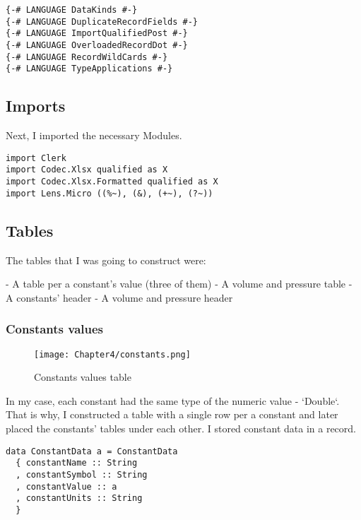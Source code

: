 \begin{listing}[!h]
  \begin{verbatim}
{-# LANGUAGE DataKinds #-}
{-# LANGUAGE DuplicateRecordFields #-}
{-# LANGUAGE ImportQualifiedPost #-}
{-# LANGUAGE OverloadedRecordDot #-}
{-# LANGUAGE RecordWildCards #-}
{-# LANGUAGE TypeApplications #-}
\end{verbatim}
\caption{Language extensions}
\label{example3:extensions}
\end{listing}

\subsection{Imports}

Next, I imported the necessary Modules.

\begin{listing}[!h]
  \begin{verbatim}
import Clerk
import Codec.Xlsx qualified as X
import Codec.Xlsx.Formatted qualified as X
import Lens.Micro ((%~), (&), (+~), (?~))
\end{verbatim}
\caption{Imports}
\label{example3:imports}
\end{listing}

\subsection{Tables}

The tables that I was going to construct were:

- A table per a constant's value (three of them)
- A volume and pressure table
- A constants' header
- A volume and pressure header

\subsubsection{Constants values}

\begin{figure}[h]
  \centering
  \texttt{[image: Chapter4/constants.png]}
  \caption{Constants values table}
  \label{fig:constants}
\end{figure}

In my case, each constant had the same type of the numeric value - `Double`.
That is why, I constructed a table with a single row per a constant and later placed the constants' tables under each other. I stored constant data in a record.

\begin{listing}[!h]
  \begin{verbatim}
data ConstantData a = ConstantData
  { constantName :: String
  , constantSymbol :: String
  , constantValue :: a
  , constantUnits :: String
  }
\end{verbatim}
\caption{Constant data}
\label{example3:constantData}
\end{listing}


